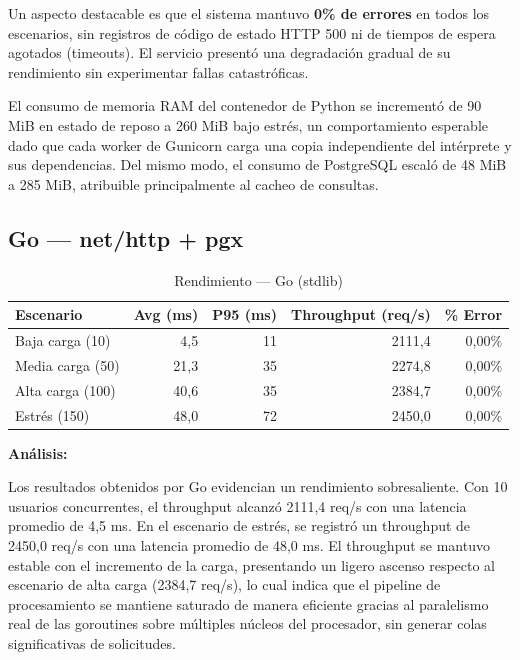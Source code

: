 \documentclass[12pt,a4paper]{article}
\begin{document}
Un aspecto destacable es que el sistema mantuvo \textbf{0\% de errores} en todos los escenarios, sin registros de código de estado HTTP 500 ni de tiempos de espera agotados (timeouts). El servicio presentó una degradación gradual de su rendimiento sin experimentar fallas catastróficas.

El consumo de memoria RAM del contenedor de Python se incrementó de 90 MiB en estado de reposo a 260 MiB bajo estrés, un comportamiento esperable dado que cada worker de Gunicorn carga una copia independiente del intérprete y sus dependencias. Del mismo modo, el consumo de PostgreSQL escaló de 48 MiB a 285 MiB, atribuible principalmente al cacheo de consultas.

\subsection{Go --- net/http + pgx}

\begin{table}[h]
\centering
\small
\begin{tabular}{lrrrr}
\toprule
\textbf{Escenario} & \textbf{Avg (ms)} & \textbf{P95 (ms)} & \textbf{Throughput (req/s)} & \textbf{\% Error} \\
\midrule
Baja carga (10)  & 4,5  & 11 & 2111,4 & 0,00\% \\
Media carga (50) & 21,3 & 35 & 2274,8 & 0,00\% \\
Alta carga (100) & 40,6 & 35 & 2384,7 & 0,00\% \\
Estrés (150)     & 48,0 & 72 & 2450,0 & 0,00\% \\
\bottomrule
\end{tabular}
\caption{Rendimiento --- Go (stdlib)}
\end{table}

\vspace{0.3cm}
\textbf{Análisis:}

Los resultados obtenidos por Go evidencian un rendimiento sobresaliente. Con 10 usuarios concurrentes, el throughput alcanzó 2111,4 req/s con una latencia promedio de 4,5 ms. En el escenario de estrés, se registró un throughput de 2450,0 req/s con una latencia promedio de 48,0 ms. El throughput se mantuvo estable con el incremento de la carga, presentando un ligero ascenso respecto al escenario de alta carga (2384,7 req/s), lo cual indica que el pipeline de procesamiento se mantiene saturado de manera eficiente gracias al paralelismo real de las goroutines sobre múltiples núcleos del procesador, sin generar colas significativas de solicitudes.
\end{document}
